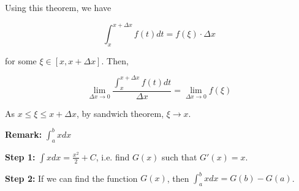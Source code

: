 Using this theorem, we have

$$ \int_x^{x + \Delta x} f(t) dt = f(\xi) \cdot \Delta x $$

for some $\xi \in [x, x + \Delta x]$. Then,

$$ \lim_{\Delta x \to 0} \frac{\int_x^{x+\Delta x} f(t) dt}{\Delta x} = \lim_{\Delta x \to 0} f(\xi) $$

As $x \leq \xi \leq x + \Delta x$, by sandwich theorem, $\xi \to x$.

\textbf{Remark:} $\int_a^b x dx$

\textbf{Step 1:} $\int x dx = \frac{x^2}{2} + C$, i.e. find $G(x)$ such that $G'(x) = x$.

\textbf{Step 2:} If we can find the function $G(x)$, then $\int_a^b x dx = G(b) - G(a)$.